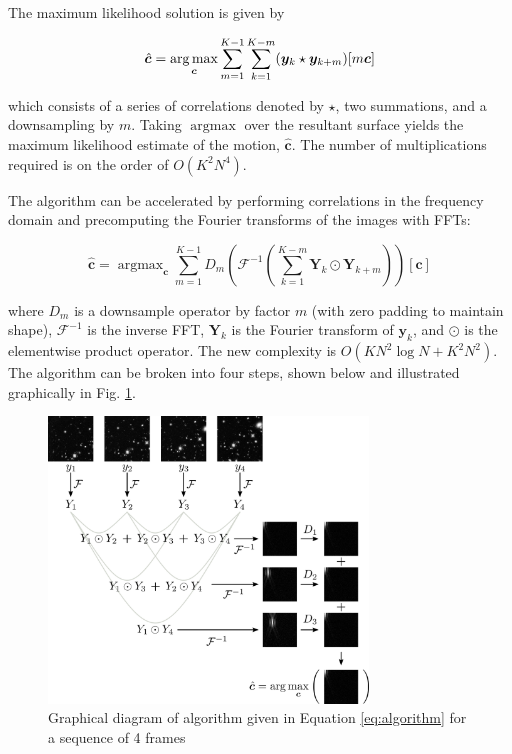 \documentclass{article}
\newcommand\lstar{\mkern4mu{\star}\mkern4mu}
\DeclareMathOperator*{\argmax}{\arg\max}
\begin{document}
The maximum likelihood solution is given by

\begin{equation}
\hat{\bm{c}} = \argmax_{\bm{c}} \sum_{m=1}^{K-1}\sum_{k=1}^{K-m} (\bm{y}_k \lstar \bm{y}_{k+m})[m\bm{c}]
\label{eq:algorithm_orig}
\end{equation}

which consists of a series of correlations denoted by $\star$, two summations, and a downsampling by $m$.  Taking $\argmax$ over the resultant surface yields the maximum likelihood estimate of the motion, $\hat{\bm{c}}$.  The number of multiplications required is on the order of $O(K^2N^4).$

The algorithm can be accelerated by performing correlations in the frequency domain and precomputing the Fourier transforms of the images with FFTs:

\begin{equation}
\hat{\bm{c}} = \argmax_{\bm{c}} \sum_{m=1}^{K-1} D_m \left(
\mathcal{F}^{-1} \left( \sum_{k=1}^{K-m} \bm{Y}_k \odot \bm{Y}_{k+m} \right)
\right)[\bm{c}]
\label{eq:algorithm}
\end{equation}

where $D_m$ is a downsample operator by factor $m$ (with zero padding to maintain shape), $\mathcal{F}^{-1}$ is the inverse FFT, $\bm{Y}_k$ is the Fourier transform of $\bm{y}_k$, and $\odot$ is the elementwise product operator.  The new complexity is $O(KN^2\log N + K^2N^2)$.
The algorithm can be broken into four steps, shown below and illustrated graphically in Fig. \ref{fig:algorithm}.

\begin{figure}[htb]
  \begin{minipage}[b]{1\linewidth}
    \centering
    \centerline{\includegraphics[width=8.5cm]{images/algorithm.png}}
  \end{minipage}
  \caption{Graphical diagram of algorithm given in Equation \ref{eq:algorithm} for a sequence of 4 frames}
  \label{fig:algorithm}
\end{figure}
\end{document}
